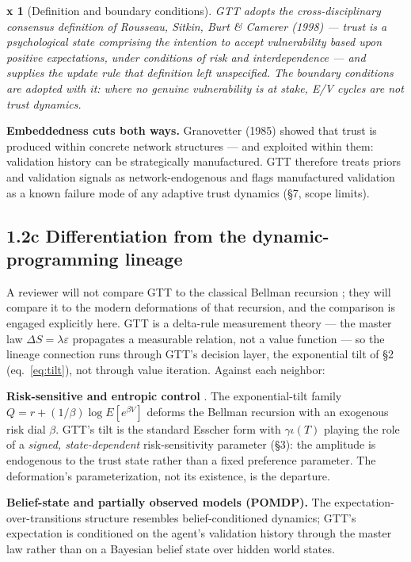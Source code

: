 \documentclass[11pt,twocolumn]{article}
\theoremstyle{gttdef}
\newtheorem*{gttdef}{x}
\theoremstyle{gttplain}
\begin{document}
\begin{gttdef}[{Definition and boundary conditions}]

GTT adopts the cross-disciplinary consensus definition of Rousseau, Sitkin, Burt \& Camerer (1998) --- trust is a psychological state comprising the intention to accept vulnerability based upon positive expectations, under conditions of risk and interdependence --- and supplies the update rule that definition left unspecified. The boundary conditions are adopted with it: where no genuine vulnerability is at stake, E/V cycles are not trust dynamics.

\end{gttdef}

\textbf{Embeddedness cuts both ways.} Granovetter (1985) showed that trust is produced within concrete network structures --- and exploited within them: validation history can be strategically manufactured. GTT therefore treats priors and validation signals as network-endogenous and flags manufactured validation as a known failure mode of any adaptive trust dynamics (\S{}7, scope limits).

\subsection*{1.2c Differentiation from the dynamic-programming lineage}

A reviewer will not compare GTT to the classical Bellman recursion \citep{bellman1957}; they will compare it to the modern deformations of that recursion, and the comparison is engaged explicitly here. GTT is a delta-rule measurement theory --- the master law $\Delta S = \lambda\varepsilon$ propagates a measurable relation, not a value function --- so the lineage connection runs through GTT's decision layer, the exponential tilt of \S{}2 (eq.~\ref{eq:tilt}), not through value iteration. Against each neighbor:

\textbf{Risk-sensitive and entropic control} \citep{howardmatheson1972,whittle1990,hansensargent1995,marcus1997}. The exponential-tilt family $Q = r + (1/\beta)\log E[e^{\beta V}]$ deforms the Bellman recursion with an exogenous risk dial $\beta$. GTT's tilt is the standard Esscher form with $\gamma\iota(T)$ playing the role of a \emph{signed, state-dependent} risk-sensitivity parameter (\S{}3): the amplitude is endogenous to the trust state rather than a fixed preference parameter. The deformation's parameterization, not its existence, is the departure.

\textbf{Belief-state and partially observed models (POMDP).} The expectation-over-transitions structure resembles belief-conditioned dynamics; GTT's expectation is conditioned on the agent's validation history through the master law rather than on a Bayesian belief state over hidden world states.
\end{document}
